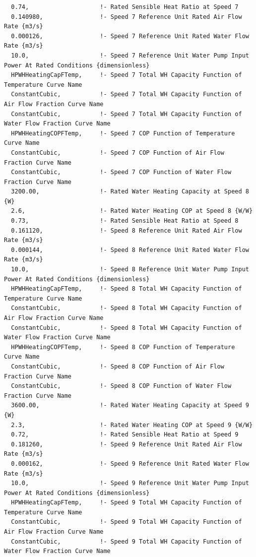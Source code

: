 \begin{lstlisting}
  0.74,                    !- Rated Sensible Heat Ratio at Speed 7
  0.140980,                !- Speed 7 Reference Unit Rated Air Flow Rate {m3/s}
  0.000126,                !- Speed 7 Reference Unit Rated Water Flow Rate {m3/s}
  10.0,                    !- Speed 7 Reference Unit Water Pump Input Power At Rated Conditions {dimensionless}
  HPWHHeatingCapFTemp,     !- Speed 7 Total WH Capacity Function of Temperature Curve Name
  ConstantCubic,           !- Speed 7 Total WH Capacity Function of Air Flow Fraction Curve Name
  ConstantCubic,           !- Speed 7 Total WH Capacity Function of Water Flow Fraction Curve Name
  HPWHHeatingCOPFTemp,     !- Speed 7 COP Function of Temperature Curve Name
  ConstantCubic,           !- Speed 7 COP Function of Air Flow Fraction Curve Name
  ConstantCubic,           !- Speed 7 COP Function of Water Flow Fraction Curve Name
  3200.00,                 !- Rated Water Heating Capacity at Speed 8 {W}
  2.6,                     !- Rated Water Heating COP at Speed 8 {W/W}
  0.73,                    !- Rated Sensible Heat Ratio at Speed 8
  0.161120,                !- Speed 8 Reference Unit Rated Air Flow Rate {m3/s}
  0.000144,                !- Speed 8 Reference Unit Rated Water Flow Rate {m3/s}
  10.0,                    !- Speed 8 Reference Unit Water Pump Input Power At Rated Conditions {dimensionless}
  HPWHHeatingCapFTemp,     !- Speed 8 Total WH Capacity Function of Temperature Curve Name
  ConstantCubic,           !- Speed 8 Total WH Capacity Function of Air Flow Fraction Curve Name
  ConstantCubic,           !- Speed 8 Total WH Capacity Function of Water Flow Fraction Curve Name
  HPWHHeatingCOPFTemp,     !- Speed 8 COP Function of Temperature Curve Name
  ConstantCubic,           !- Speed 8 COP Function of Air Flow Fraction Curve Name
  ConstantCubic,           !- Speed 8 COP Function of Water Flow Fraction Curve Name
  3600.00,                 !- Rated Water Heating Capacity at Speed 9 {W}
  2.3,                     !- Rated Water Heating COP at Speed 9 {W/W}
  0.72,                    !- Rated Sensible Heat Ratio at Speed 9
  0.181260,                !- Speed 9 Reference Unit Rated Air Flow Rate {m3/s}
  0.000162,                !- Speed 9 Reference Unit Rated Water Flow Rate {m3/s}
  10.0,                    !- Speed 9 Reference Unit Water Pump Input Power At Rated Conditions {dimensionless}
  HPWHHeatingCapFTemp,     !- Speed 9 Total WH Capacity Function of Temperature Curve Name
  ConstantCubic,           !- Speed 9 Total WH Capacity Function of Air Flow Fraction Curve Name
  ConstantCubic,           !- Speed 9 Total WH Capacity Function of Water Flow Fraction Curve Name

\end{lstlisting}
